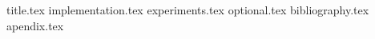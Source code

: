 \documentclass[12pt]{article}
\newcommand*{\sectiondir}{sections/}
\begin{document}
	{title.tex}
	\tableofcontents
	\newpage
	{implementation.tex}
	{experiments.tex}
	{optional.tex}
	{bibliography.tex}
	\newpage
	{apendix.tex}
\end{document}
